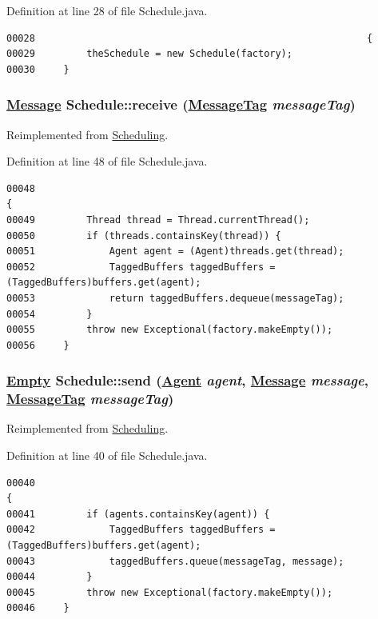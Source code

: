 Definition at line 28 of file Schedule.java.\footnotesize\begin{verbatim}00028                                                          {
00029         theSchedule = new Schedule(factory);
00030     }
\end{verbatim}\normalsize 
\hypertarget{classSchedule_a1}{
\subsubsection[receive]{\setlength{\rightskip}{0pt plus 5cm}\hyperlink{interfaceMessage}{Message} Schedule::receive (\hyperlink{interfaceMessageTag}{Message\-Tag} {\em message\-Tag})}}
\label{classSchedule_a1}




Reimplemented from \hyperlink{interfaceScheduling_a1}{Scheduling}.

Definition at line 48 of file Schedule.java.\footnotesize\begin{verbatim}00048                                                                      {
00049         Thread thread = Thread.currentThread();
00050         if (threads.containsKey(thread)) {
00051             Agent agent = (Agent)threads.get(thread);
00052             TaggedBuffers taggedBuffers = (TaggedBuffers)buffers.get(agent);
00053             return taggedBuffers.dequeue(messageTag);
00054         }
00055         throw new Exceptional(factory.makeEmpty());
00056     }   
\end{verbatim}\normalsize 
\hypertarget{classSchedule_a0}{
\subsubsection[send]{\setlength{\rightskip}{0pt plus 5cm}\hyperlink{interfaceEmpty}{Empty} Schedule::send (\hyperlink{interfaceAgent}{Agent} {\em agent}, \hyperlink{interfaceMessage}{Message} {\em message}, \hyperlink{interfaceMessageTag}{Message\-Tag} {\em message\-Tag})}}
\label{classSchedule_a0}




Reimplemented from \hyperlink{interfaceScheduling_a0}{Scheduling}.

Definition at line 40 of file Schedule.java.\footnotesize\begin{verbatim}00040                                                                                               {
00041         if (agents.containsKey(agent)) {
00042             TaggedBuffers taggedBuffers = (TaggedBuffers)buffers.get(agent);
00043             taggedBuffers.queue(messageTag, message);
00044         }
00045         throw new Exceptional(factory.makeEmpty());
00046     }   
\end{verbatim}\normalsize 


